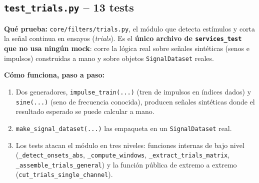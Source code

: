 \documentclass[11pt,a4paper]{article}
\begin{document}
\subsection{\texttt{test\_\allowbreak trials.py} -- 13 tests}

\textbf{Qué prueba:} \texttt{core/filters/trials.py}, el módulo que detecta estímulos y corta la señal
continua en ensayos (\textit{trials}). Es el \textbf{único archivo de \texttt{services\_\allowbreak test} que no usa
ningún mock}: corre la lógica real sobre señales sintéticas (senos e impulsos) construidas a mano y sobre
objetos \texttt{SignalDataset} reales.

\textbf{Cómo funciona, paso a paso:}
\begin{enumerate}
  \item Dos generadores, \texttt{impulse\_\allowbreak train(...)} (tren de impulsos en índices dados) y
        \texttt{sine(...)} (seno de frecuencia conocida), producen señales sintéticas donde el resultado
        esperado se puede calcular a mano.
  \item \texttt{make\_\allowbreak signal\_\allowbreak dataset(...)} las empaqueta en un \texttt{SignalDataset} real.
  \item Los tests atacan el módulo en tres niveles: funciones internas de bajo nivel
        (\texttt{\_\allowbreak detect\_\allowbreak onsets\_\allowbreak abs}, \texttt{\_\allowbreak compute\_\allowbreak windows}, \texttt{\_\allowbreak extract\_\allowbreak trials\_\allowbreak matrix},
        \texttt{\_\allowbreak assemble\_\allowbreak trials\_\allowbreak general}) y la función pública de extremo a extremo
        (\texttt{cut\_\allowbreak trials\_\allowbreak single\_\allowbreak channel}).
\end{enumerate}
\end{document}
